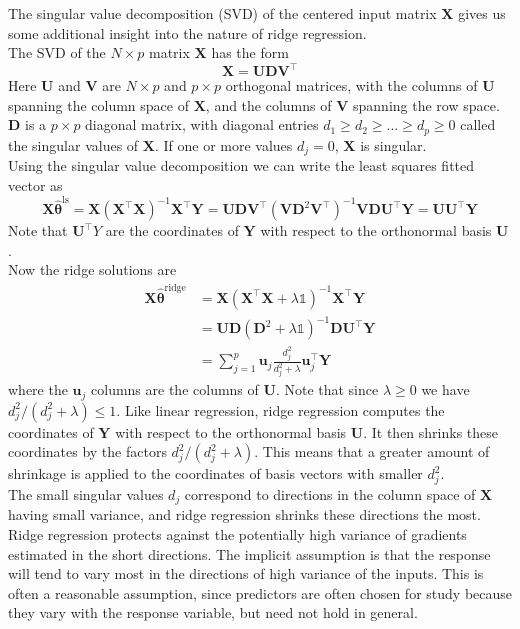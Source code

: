 \documentclass[twoside]{article}
\begin{document}
The singular value decomposition (SVD) of the centered input matrix $\boldsymbol{X}$ gives us some additional insight into the nature of ridge regression.\\
The SVD of the $N \times p$ matrix $\boldsymbol{X}$ has the form
\begin{equation*}
    \boldsymbol{X} = \boldsymbol{UDV^\intercal}
\end{equation*}
Here $\boldsymbol{U}$ and $\boldsymbol{V}$ are $N\times p$ and $p \times p$ orthogonal matrices, with the columns of $\boldsymbol{U}$ spanning the column space of $\boldsymbol{X}$, and the columns of $\boldsymbol{V}$ spanning the row space. $\boldsymbol{D}$ is a $p \times p$ diagonal matrix, with diagonal entries $d_1 \geq d_2 \geq ... \geq d_p \geq 0$ called the singular values of $\boldsymbol{X}$. If one or more values $d_j = 0$, $\boldsymbol{X}$ is singular.\\
Using the singular value decomposition we can write the least squares fitted vector as
\begin{equation*}
    \boldsymbol{X\hat{\theta}}^\text{ls} = \boldsymbol{X}(\boldsymbol{X^\intercal X})^{-1}\boldsymbol{X^\intercal Y} = \boldsymbol{UDV^\intercal}(\boldsymbol{VD}^2\boldsymbol{V}^\intercal)^{-1}\boldsymbol{VDU^\intercal Y} = \boldsymbol{UU^\intercal Y}
\end{equation*}
Note that $\boldsymbol{U^\intercal}Y$ are the coordinates of $\boldsymbol{Y}$ with respect to the orthonormal basis $\boldsymbol{U}$.\\
Now the ridge solutions are
\begin{equation*}
\begin{aligned}
    \boldsymbol{X}\hat{\boldsymbol{\theta}}^\text{ridge} &= \boldsymbol{X}(\boldsymbol{X^\intercal X} + \lambda\mathds{1})^{-1}\boldsymbol{X^\intercal Y} \\
    &= \boldsymbol{UD}(\boldsymbol{D}^2 + \lambda\mathds{1})^{-1}\boldsymbol{DU^\intercal Y}\\
    &= \sum\limits_{j = 1}^{p}\boldsymbol{u}_j\frac{d_j^2}{d_j^2 + \lambda}\boldsymbol{u}_j^\intercal \boldsymbol{Y}
\end{aligned}
\end{equation*}
where the $\boldsymbol{u}_j$ columns are the columns of $\boldsymbol{U}$. Note that since $\lambda \geq 0$ we have $d_j^2 /(d_j^2 + \lambda) \leq 1$.  Like linear regression, ridge regression computes the coordinates of $\boldsymbol{Y}$ with respect to the orthonormal basis $\boldsymbol{U}$. It then shrinks these coordinates by the factors $d_j^2 /(d_j^2 + \lambda)$. This means that a greater amount of shrinkage is applied to the coordinates of basis vectors with smaller $d_j^2$.\\
The small singular values $d_j$ correspond to directions in the column space of $\boldsymbol{X}$ having small variance, and ridge regression shrinks these directions the most.\\
Ridge regression protects against the potentially high variance of gradients estimated in the short directions. The implicit assumption is that the response will tend to vary most in the directions of high variance of the inputs. This is often a reasonable assumption, since predictors are often chosen for study because they vary with the response variable, but need not hold in general.
\end{document}

